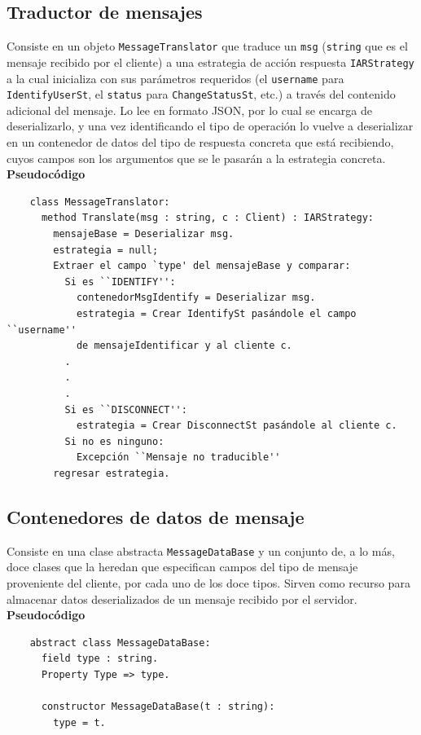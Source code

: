 \subsection{Traductor de mensajes}
Consiste en un objeto \texttt{MessageTranslator} que traduce un \texttt{msg} (\texttt{string} que es el mensaje recibido por el cliente) a una estrategia de acción respuesta \texttt{IARStrategy} a la cual inicializa con sus parámetros requeridos (el \texttt{username} para \texttt{IdentifyUserSt}, el \texttt{status} para \texttt{ChangeStatusSt}, etc.) a través del contenido adicional del mensaje. Lo lee en formato JSON, por lo cual se encarga de deserializarlo, y una vez identificando el tipo de operación lo vuelve a deserializar en un contenedor de datos del tipo de respuesta concreta que está recibiendo, cuyos campos son los argumentos que se le pasarán a la estrategia concreta.
\\

\textbf{Pseudocódigo}

\begin{verbatim}
	class MessageTranslator:	
	  method Translate(msg : string, c : Client) : IARStrategy:
	    mensajeBase = Deserializar msg.
	    estrategia = null;
	    Extraer el campo `type' del mensajeBase y comparar:
	      Si es ``IDENTIFY'':
	        contenedorMsgIdentify = Deserializar msg.
	        estrategia = Crear IdentifySt pasándole el campo ``username''
	        de mensajeIdentificar y al cliente c.
	      .
	      .
	      .
	      Si es ``DISCONNECT'':
	        estrategia = Crear DisconnectSt pasándole al cliente c.
	      Si no es ninguno:
	        Excepción ``Mensaje no traducible''
	    regresar estrategia.
\end{verbatim}


\subsection{Contenedores de datos de mensaje}
Consiste en una clase abstracta \texttt{MessageDataBase} y un conjunto de, a lo más, doce clases que la heredan que especifican campos del tipo de mensaje proveniente del cliente, por cada uno de los doce tipos. Sirven como recurso para almacenar datos deserializados de un mensaje recibido por el servidor.
\\

\textbf{Pseudocódigo}
\begin{verbatim}
	abstract class MessageDataBase:
	  field type : string.
	  Property Type => type.
	  
	  constructor MessageDataBase(t : string):
	    type = t.  
\end{verbatim}

